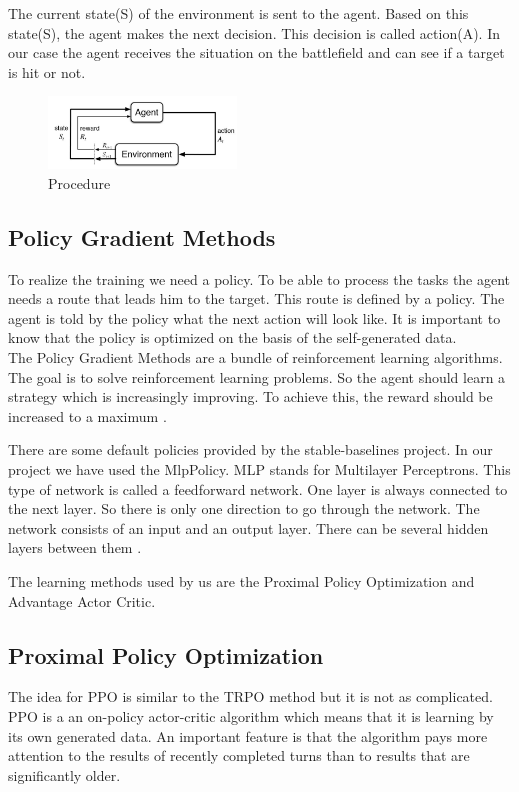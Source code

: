 \documentclass[sigconf]{acmart}
\begin{document}
The current state(S) of the environment is sent to the agent. Based on this state(S), the agent makes the next decision.
This decision is called action(A). In our case the agent receives the situation on the battlefield and can see if a target is hit or not.


\begin{figure}[ht]
 \centering
 \includegraphics[width=50mm]{reinforcement-learning-fig1-700.jpg}
  \caption{Procedure}
  \label{fig:loss}
\end{figure}

\subsection{Policy Gradient Methods}
To realize the training we need a policy. To be able to process the tasks the agent needs a route that leads him to the target.
This route is defined by a policy. The agent is told by the policy what the next action will look like.
It is important to know that the policy is optimized on the basis of the self-generated data.\\

The Policy Gradient Methods are a bundle of reinforcement learning algorithms. The goal is to solve reinforcement learning problems.
So the agent should learn a strategy which is increasingly improving. To achieve this, the reward should be increased to a maximum \cite[16-18]{ravichandiran2018hands}.

There are some default policies provided by the stable-baselines project. 
In our project we have used the MlpPolicy. MLP stands for Multilayer Perceptrons.
This type of network is called a feedforward network.
One layer is always connected to the next layer. So there is only one direction to go through the network.
The network consists of an input and an output layer. There can be several hidden layers between them \cite[174]{Frochte.2019}.

The learning methods used by us are the Proximal Policy Optimization and Advantage Actor Critic.

\subsection{Proximal Policy Optimization}
The idea for PPO is similar to the TRPO method but it is not as complicated. 
PPO is a an on-policy actor-critic algorithm which means that it is learning by its own generated data.
An important feature is that the algorithm pays more attention to the results of recently completed turns than to results that are significantly older.
\end{document}
